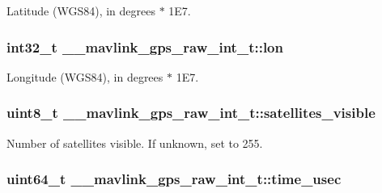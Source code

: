 Latitude (W\+G\+S84), in degrees $\ast$ 1\+E7. 

\hypertarget{struct____mavlink__gps__raw__int__t_a025fd2dd700ff7180af5a26c2a3497f4}{
\subsubsection[{lon}]{\setlength{\rightskip}{0pt plus 5cm}int32\+\_\+t \+\_\+\+\_\+mavlink\+\_\+gps\+\_\+raw\+\_\+int\+\_\+t\+::lon}}\label{struct____mavlink__gps__raw__int__t_a025fd2dd700ff7180af5a26c2a3497f4}


Longitude (W\+G\+S84), in degrees $\ast$ 1\+E7. 

\hypertarget{struct____mavlink__gps__raw__int__t_af1481a191aa3ffbf832dc3a4c35cbf09}{
\subsubsection[{satellites\+\_\+visible}]{\setlength{\rightskip}{0pt plus 5cm}uint8\+\_\+t \+\_\+\+\_\+mavlink\+\_\+gps\+\_\+raw\+\_\+int\+\_\+t\+::satellites\+\_\+visible}}\label{struct____mavlink__gps__raw__int__t_af1481a191aa3ffbf832dc3a4c35cbf09}


Number of satellites visible. If unknown, set to 255. 

\hypertarget{struct____mavlink__gps__raw__int__t_a39d30393d02f2b1882040e3fa063f6ea}{
\subsubsection[{time\+\_\+usec}]{\setlength{\rightskip}{0pt plus 5cm}uint64\+\_\+t \+\_\+\+\_\+mavlink\+\_\+gps\+\_\+raw\+\_\+int\+\_\+t\+::time\+\_\+usec}}\label{struct____mavlink__gps__raw__int__t_a39d30393d02f2b1882040e3fa063f6ea}


